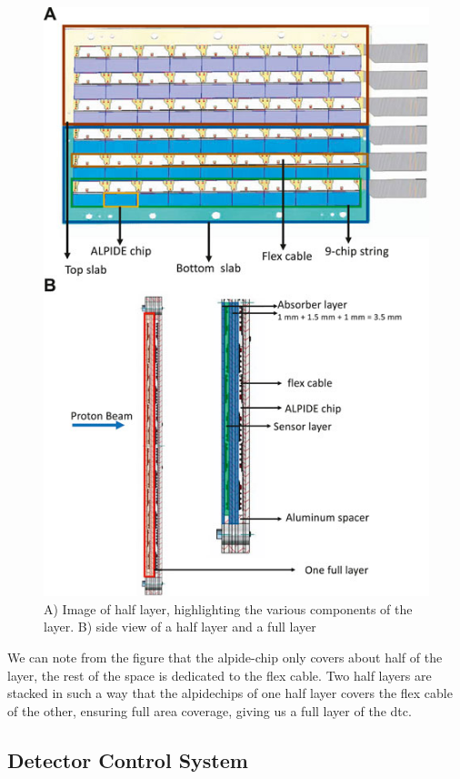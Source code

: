 \documentclass[main.tex]{subfiles}
\begin{document}
\begin{figure}[!ht]
    \centering
    \includegraphics[scale = 0.5]{images/half_layer.jpg}
    \caption{A) Image of half layer, highlighting the various components of the layer. B) side view of a half layer and a full layer\cite{pct_project}}
    \label{fig: half_layer}
\end{figure}
\FloatBarrier

We can note from the figure that the \gls{alpide}-chip only covers about half of the layer, the rest of the space is dedicated to the flex cable. Two half layers are stacked in such a way that the \gls{alpide}chips of one half layer covers the flex cable of the other, ensuring full area coverage, giving us a full layer of the \gls{dtc}.

\subsection{Detector Control System}
\end{document}
